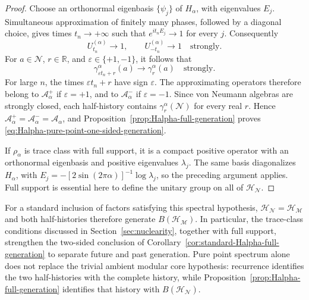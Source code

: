 \documentclass[a4paper,11pt]{article}
\theoremstyle{definition}
\newcommand{\mN}{\mathcal{N}}
\newcommand{\mH}{\mathcal{H}}
\newcommand{\mM}{\mathcal{M}}
\begin{document}
\begin{proof}
Choose an orthonormal eigenbasis $\{\psi_j\}$ of $H_\alpha$, with
eigenvalues $E_j$. Simultaneous approximation of finitely many phases,
followed by a diagonal choice, gives times $t_n\to+\infty$ such that
$e^{it_nE_j}\to1$ for every $j$. Consequently
\begin{equation}
    U_{t_n}^{(\alpha)}\longrightarrow1,
    \qquad U_{-t_n}^{(\alpha)}\longrightarrow1
    \quad\text{strongly}.
    \label{eq:Halpha-pure-point-recurrence}
\end{equation}
For $a\in\mN$, $r\in\mathbb R$, and
$\varepsilon\in\{+1,-1\}$, it follows that
\begin{equation}
    \gamma_{\varepsilon t_n+r}^\alpha(a)
    \longrightarrow\gamma_r^\alpha(a)
    \quad\text{strongly}.
    \label{eq:Halpha-one-sided-recurrence-approximation}
\end{equation}
For large $n$, the times $\varepsilon t_n+r$ have sign $\varepsilon$.
The approximating operators therefore belong to
$\mathcal A_\alpha^+$ if $\varepsilon=+1$, and to
$\mathcal A_\alpha^-$ if $\varepsilon=-1$. Since von Neumann algebras
are strongly closed, each half-history contains
$\gamma_r^\alpha(\mN)$ for every real $r$. Hence
$\mathcal A_\alpha^+=\mathcal A_\alpha^-=\mathcal A_\alpha$, and
Proposition~\ref{prop:Halpha-full-generation} proves
\eqref{eq:Halpha-pure-point-one-sided-generation}.

If $\rho_\alpha$ is trace class with full support, it is a compact
positive operator with an orthonormal eigenbasis and positive
eigenvalues $\lambda_j$. The same basis diagonalizes $H_\alpha$, with
$E_j=-[2\sin(2\pi\alpha)]^{-1}\log\lambda_j$, so the preceding argument
applies. Full support is essential here to define the unitary group
on all of $\mH_{\mN}$.
\end{proof}

For a standard inclusion of factors satisfying this spectral hypothesis,
$\mH_{\mN}=\mH_{\mM}$ and both half-histories therefore generate
$B(\mH_{\mM})$. In particular, the trace-class conditions discussed in
Section~\ref{sec:nuclearity}, together with full support, strengthen the
two-sided conclusion of Corollary~\ref{cor:standard-Halpha-full-generation}
to separate future and past generation. Pure point spectrum alone
does not replace the trivial ambient modular core hypothesis: recurrence
identifies the two half-histories with the complete history, while
Proposition~\ref{prop:Halpha-full-generation} identifies that history
with $B(\mH_{\mN})$.
\end{document}

